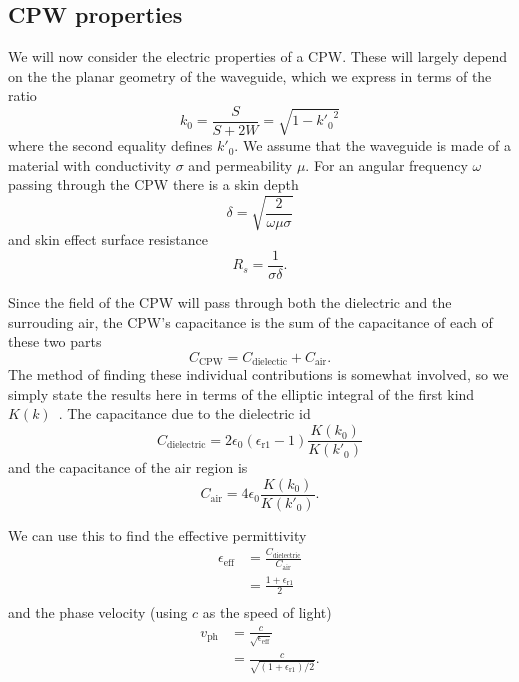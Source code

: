 \subsection{CPW properties}

We will now consider the electric properties of a CPW. These will largely
depend on the the planar geometry of the waveguide, which we express in terms
of the ratio~\cite{1127105, Simons2004}
%
\begin{equation}
  k_0 = \frac{S}{S+2W} = \sqrt{1-{k'_0}^2}
  \label{eqn:k0def}
\end{equation}
%
where the second equality defines $k'_0$.
%
We assume that the waveguide is made of a material with conductivity $\sigma$
and permeability $\mu$. For an angular frequency $\omega$ passing through the
CPW there is a skin depth~\cite{Simons2004}
%
\begin{equation}
  \delta = \sqrt{\frac{2}{\omega\mu\sigma}}
\end{equation}
%
and skin effect surface resistance~\cite{Simons2004}
%
\begin{equation}
  R_s = \frac{1}{\sigma\delta}.
\end{equation}

Since the field of the CPW will pass through both the dielectric and the
surrouding air, the CPW's capacitance is the sum of the capacitance of each of
these two parts
%
\begin{equation}
  C_\text{CPW} = C_\text{dielectic} + C_\text{air}.
\end{equation}
%
The method of finding these individual contributions is somewhat involved, so
we simply state the results here in terms of the elliptic integral of the
first kind $K(k)$~\cite{Simons2004}. The capacitance due to the dielectric id 
%
%
\begin{equation}
  C_\text{dielectric} = 2\epsilon_0(\epsilon_\text{r1}-1)\frac{K(k_0)}{K(k'_0)}
\end{equation}
%
and the capacitance of the air region is
%
\begin{equation}
  C_\text{air} = 4\epsilon_0 \frac{K(k_0)}{K(k'_0)}.
\end{equation}

We can use this to find the effective permittivity~\cite{Simons2004}
%
\begin{align}
  \epsilon_\text{eff} &= \frac{C_\text{dielectric}}{C_\text{air}} \\
    &= \frac{1+ \epsilon_\text{r1}}{2} \\
\end{align}
%
and the phase velocity (using $c$ as the speed of light)~\cite{Simons2004}
%
\begin{align}
  v_\text{ph} &= \frac{c}{\sqrt{\epsilon_\text{eff}}} \\
    &= \frac{c}{\sqrt{(1 + \epsilon_\text{r1})/2}}.
\end{align}

